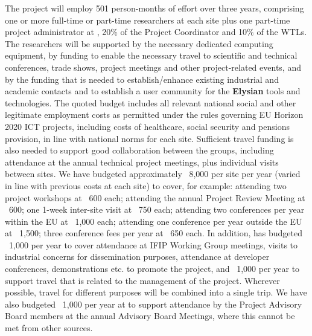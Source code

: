 \documentclass[a4paper,11pt]{article}
\newcommand{\project}[1]{\textbf{#1}\xspace}
\newcommand{\SECURITY}{\project{Elysian}}
\newcommand{\TheProject}{\SECURITY}
\begin{document}
The project will employ 501 person-months of effort over three
years, comprising one or more full-time or part-time researchers at each site
plus one part-time project administrator at \SAshort{}, %
20\% of the Project Coordinator and 10\% of the WTLs. The researchers will be supported by
the necessary dedicated computing equipment,
by funding to enable the necessary travel to scientific and technical conferences, trade shows, 
project meetings and other project-related events, and by the funding that is needed to establish/enhance existing
industrial and academic contacts and to establish a user
community for the \TheProject{} tools and technologies.
%
The quoted budget includes all relevant national social and
other legitimate employment costs as permitted under the rules
governing EU Horizon 2020 ICT projects, including costs of
healthcare, social security and pensions provision, in line with national norms for each site.
%
Sufficient travel funding is also needed to support good
collaboration between the groups, including attendance at the
annual technical project meetings, plus individual visits between
sites. We have budgeted approximately \euros{}~8,000 per
site per year (varied in line with previous
costs at each site)  to cover, for example:
attending two project workshops at \euros{}~600 each;
attending the annual Project Review Meeting at \euros{}~600;
one 1-week inter-site visit at \euros{}~750 each;
attending two conferences per year within the EU at \euros{}~1,000 each;
attending one conference per year outside the EU at \euros{}~1,500;
three conference fees per year at \euros{}~650 each.
%
\noindent
In addition, \SAshort{} has budgeted \euros{}~1,000 per year to cover attendance at
IFIP Working Group meetings, visits to industrial concerns for dissemination purposes,
attendance at developer conferences, demonstrations etc. to promote the project,
and \euros~1,000 per year to support travel that is related to the management of the
project.
Wherever possible, travel for different purposes will be
combined into a single trip. We have also budgeted \euros~1,000
per year at \SAshort{} to support attendance by the Project Advisory Board members at
the annual Advisory Board Meetings, where this cannot be met from other sources.
\end{document}

